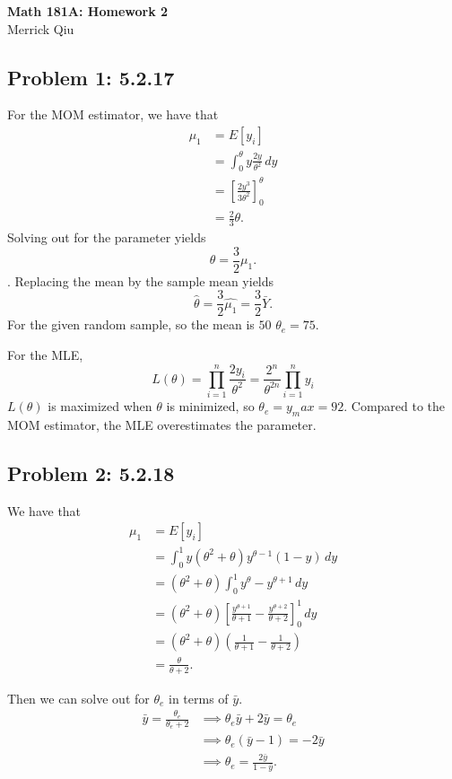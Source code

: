 \documentclass{article}
\begin{document}
\begin{center}
	\huge{\bf Math 181A: Homework 2} \\
	Merrick Qiu 
\end{center}

\subsection*{Problem 1: 5.2.17}
For the MOM estimator, we have that
\begin{align*}
	\mu_1 &= E[y_i] \\
	&= \int_0^\theta y\frac{2y}{\theta^2} \,dy \\
	&= \left[\frac{2y^3}{3\theta^2}\right]_0^\theta \\
	&= \frac{2}{3}\theta.
\end{align*}
Solving out for the parameter yields
\[
	\theta = \frac{3}{2}\mu_1.
\].
Replacing the mean by the sample mean yields 
\[
	\hat{\theta} 
	= \frac{3}{2}\hat{\mu_1}
	=\frac{3}{2}\bar{Y}.
\]
For the given random sample, 
so the mean is $50$ $\theta_e = 75$.

For the MLE,
\[
	L(\theta) = \prod_{i=1}^n \frac{2y_i}{\theta^2} 
	=\frac{2^n}{\theta^{2n}} \prod_{i=1}^n y_i 
\]
$L(\theta)$ is maximized when $\theta$ is minimized,
so $\theta_e = y_max = 92$.
Compared to the MOM estimator, the MLE overestimates the parameter.
\newpage

\subsection*{Problem 2: 5.2.18}
We have that 
\begin{align*}
	\mu_1 &= E[y_i] \\
	&= \int_0^1 y(\theta^2 + \theta)y^{\theta-1}(1-y) \,dy \\
	&= (\theta^2 + \theta) \int_0^1 y^{\theta}-y^{\theta+1} \,dy \\
	&= (\theta^2 + \theta) \left[\frac{y^{\theta+1}}{\theta+1} - 
		\frac{y^{\theta+2}}{\theta+2}\right]_0^1 \,dy \\
	&= (\theta^2 + \theta)\left(\frac{1}{\theta+1} - \frac{1}{\theta+2}\right) \\
	&= \frac{\theta}{\theta+2}. 
\end{align*}

Then we can solve out for $\theta_e$ in terms of $\bar{y}$.
\begin{align*}
	\bar{y} = \frac{\theta_e}{\theta_e+2}
	&\implies \theta_e\bar{y} + 2\bar{y} = \theta_e \\
	&\implies \theta_e(\bar{y}-1) = -2\bar{y} \\
	&\implies \theta_e = \frac{2\bar{y}}{1-\bar{y}}.
\end{align*}
\newpage
\end{document}
